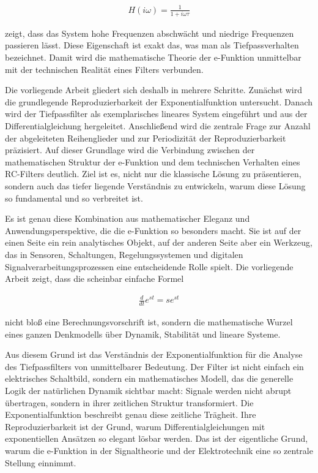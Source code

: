 \documentclass[a4paper,12pt,twoside]{report}
\theoremstyle{definition}
\begin{document}
\begin{align}
    H(i\omega) = \frac{1}{1+i\omega\tau}
\end{align}

zeigt, dass das System hohe Frequenzen abschwächt und niedrige Frequenzen passieren lässt. Diese Eigenschaft ist exakt das, was man als Tiefpassverhalten bezeichnet. Damit wird die mathematische Theorie der e-Funktion unmittelbar mit der technischen Realität eines Filters verbunden.

Die vorliegende Arbeit gliedert sich deshalb in mehrere Schritte. Zunächst wird die grundlegende Reproduzierbarkeit der Exponentialfunktion untersucht. Danach wird der Tiefpassfilter als exemplarisches lineares System eingeführt und aus der Differentialgleichung hergeleitet. Anschließend wird die zentrale Frage zur Anzahl der abgeleiteten Reihenglieder und zur Periodizität der Reproduzierbarkeit präzisiert. Auf dieser Grundlage wird die Verbindung zwischen der mathematischen Struktur der e-Funktion und dem technischen Verhalten eines RC-Filters deutlich. Ziel ist es, nicht nur die klassische Lösung zu präsentieren, sondern auch das tiefer liegende Verständnis zu entwickeln, warum diese Lösung so fundamental und so verbreitet ist.

Es ist genau diese Kombination aus mathematischer Eleganz und Anwendungsperspektive, die die e-Funktion so besonders macht. Sie ist auf der einen Seite ein rein analytisches Objekt, auf der anderen Seite aber ein Werkzeug, das in Sensoren, Schaltungen, Regelungssystemen und digitalen Signalverarbeitungsprozessen eine entscheidende Rolle spielt. Die vorliegende Arbeit zeigt, dass die scheinbar einfache Formel

\begin{align}
    \frac{d}{dt} e^{st} = s e^{st}
\end{align}

nicht bloß eine Berechnungsvorschrift ist, sondern die mathematische Wurzel eines ganzen Denkmodells über Dynamik, Stabilität und lineare Systeme.

Aus diesem Grund ist das Verständnis der Exponentialfunktion für die Analyse des Tiefpassfilters von unmittelbarer Bedeutung. Der Filter ist nicht einfach ein elektrisches Schaltbild, sondern ein mathematisches Modell, das die generelle Logik der natürlichen Dynamik sichtbar macht: Signale werden nicht abrupt übertragen, sondern in ihrer zeitlichen Struktur transformiert. Die Exponentialfunktion beschreibt genau diese zeitliche Trägheit. Ihre Reproduzierbarkeit ist der Grund, warum Differentialgleichungen mit exponentiellen Ansätzen so elegant lösbar werden. Das ist der eigentliche Grund, warum die e-Funktion in der Signaltheorie und der Elektrotechnik eine so zentrale Stellung einnimmt.
\end{document}
